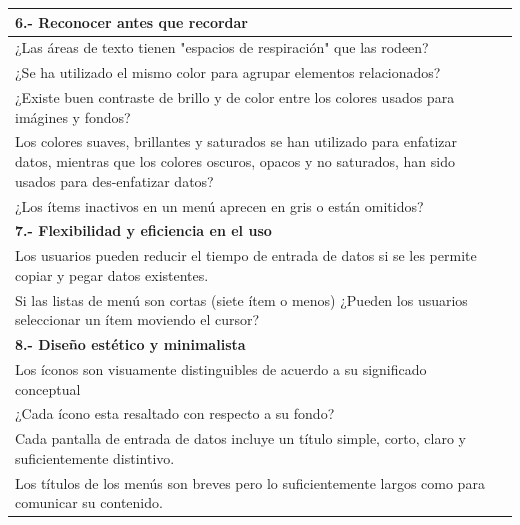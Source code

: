 \documentclass[stu, 12pt, letterpaper, donotrepeattitle, floatsintext, natbib]{apa7}
\begin{document}
\begin{longtable}{|>{\raggedright\arraybackslash}p{10cm}|>{\centering\arraybackslash}p{3cm}|}
    \textbf{6.- Reconocer antes que recordar} & \\ \hline
    ¿Las áreas de texto tienen "espacios de respiración" que las rodeen? & \\ \hline
    ¿Se ha utilizado el mismo color para agrupar elementos relacionados? & \\ \hline
    ¿Existe buen contraste de brillo y de color entre los colores usados para imágines y fondos? & \\ \hline
    Los colores suaves, brillantes y saturados se han utilizado para enfatizar datos, mientras que los colores oscuros, opacos y no saturados, han sido usados para des-enfatizar datos? & \\ \hline
    ¿Los ítems inactivos en un menú aprecen en gris o están omitidos? & \\ \hline

    \textbf{7.- Flexibilidad y eficiencia en el uso} & \\ \hline
    Los usuarios pueden reducir el tiempo de entrada de datos si se les permite copiar y pegar datos existentes. & \\ \hline
    Si las listas de menú son cortas (siete ítem o menos) ¿Pueden los usuarios seleccionar un ítem moviendo el cursor? & \\ \hline

    \textbf{8.- Diseño estético y minimalista} & \\ \hline
    Los íconos son visuamente distinguibles de acuerdo a su significado conceptual  & \\ \hline
    ¿Cada ícono esta resaltado con respecto a su fondo? & \\ \hline
    Cada pantalla de entrada de datos incluye un título simple, corto, claro y suficientemente distintivo. & \\ \hline
    Los títulos de los menús son breves pero lo suficientemente largos como para comunicar su contenido. & \\ \hline


\end{longtable}
\end{document}
